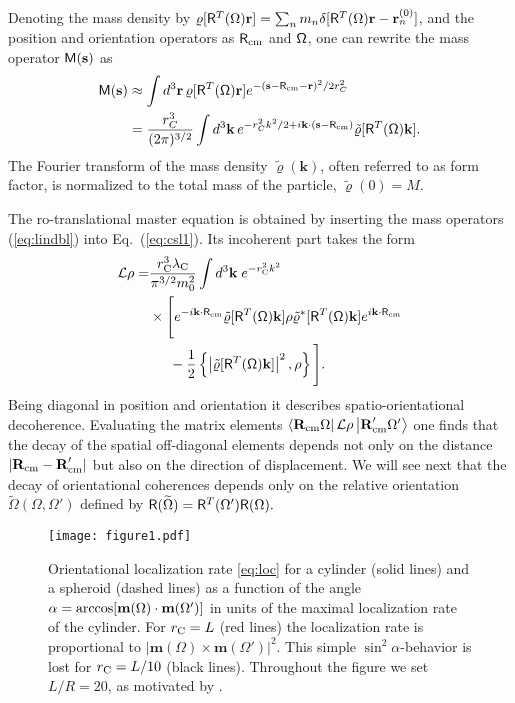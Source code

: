\documentclass[%
 twocolumn,
 amsmath,amssymb,
 aps,
 pra,
]{revtex4-1}
\newcommand{\op}[1]{{\sf #1}}
\begin{document}
Denoting the mass density by $\varrho[\op{R}^T({\Omega})\textbf{r}]= \sum_n m_n \delta[\op{R}^T({\Omega})\textbf{r}-\textbf{r}_n^{(0)}]$, and the position and orientation operators as $\op{R}_{\rm cm}$ and $\op{\Omega}$, one can rewrite the mass operator $\op{M}(\textbf{s})$ as
\begin{align} \label{eq:lindbl}
\op{M}(\textbf{s})&\approx\int d^3\textbf{r}\,
\varrho[\op{R}^T(\op{\Omega})\textbf{r}] e^{-(\textbf{s}-\op{R}_{\rm cm} - \textbf{r})^2/2r^2_C}\nonumber\\
&=\frac{r^3_C}{(2\pi)^{3/2}}\int d^3 \textbf{k}\,
e^{-r^2_C k^2/2+i\textbf{k}\cdot(\textbf{s}-\op{R}_{\rm cm})}\tilde{\varrho}[\op{R}^T(\op{\Omega})\textbf{k}].
\end{align}
The Fourier transform of the mass density $\tilde{\varrho}(\textbf{k})$, often referred to as form factor, is normalized to the total mass of the particle, $\tilde\varrho(0) = M$.

The ro-translational master equation is obtained by inserting the mass operators (\ref{eq:lindbl}) into Eq.~(\ref{eq:csl1}). Its incoherent part takes the form
\begin{align} \label{eq:csl2}
\mathcal{L}\rho=&\frac{r^3_{\rm C}\lambda_{\rm C}}{\pi^{3/2}m_0^2}\int d^3\textbf{k}\hspace{1mm}e^{-r^2_{\rm C}k^2}\nonumber\\
&\times\Bigg[e^{-i\textbf{k}\cdot\op{R}_{\rm cm}}\tilde{\varrho}[\op{R}^T(\op{\Omega})\textbf{k}]\rho\tilde{\varrho}^*[\op{R}^T(\op{\Omega})\textbf{k}]e^{i\textbf{k}\cdot\op{R}_{\rm cm}}\nonumber\\
&\phantom{\times\Big\{}-\frac{1}{2}\left\{ \left \vert\tilde{\varrho}[\op{R}^T(\op{\Omega})\textbf{k}] \right \vert^2,\rho\right\}\Bigg].
\end{align} 
 Being diagonal in position and orientation it describes spatio-orientational decoherence. Evaluating the matrix elements $\left<\textbf{R}_{\rm cm}\Omega\right|\mathcal{L}\rho\left|\textbf{R}_{\rm cm}'\Omega'\right>$ one finds that the decay of the spatial off-diagonal elements depends not only on the distance $|\textbf{R}_{\rm cm}-\textbf{R}_{\rm cm}'|$  but also on the direction of displacement. We will see next that the decay of orientational coherences depends only on the relative orientation $\widetilde \Omega(\Omega,\Omega')$ defined by $\op{R}(\widetilde \Omega)=\op{R}^T(\Omega') \op{R}(\Omega) . $ 

 \begin{figure} 
  \centering
  \texttt{[image: figure1.pdf]}
  \caption{Orientational localization rate \eqref{eq:loc} for a cylinder (solid lines) and a spheroid (dashed lines) as a function of the angle $\alpha = {\rm arccos}[\textbf{m}(\Omega) \cdot \textbf{m}(\Omega')]$ in units of the maximal localization rate of the cylinder. For $ r_{\rm C}=L$ (red lines) the localization rate is proportional to $\vert \textbf{m}(\Omega) \times \textbf{m}(\Omega') \vert^2$. This simple $\sin^2 \alpha$-behavior is lost for $ r_{\rm C}=L/10$ (black lines). Throughout the figure we set $L / R = 20$, as motivated by \cite{Kuhn2015,kuhn2016}.}
\label{fig:LocalizationRate}
\end{figure}
\end{document}
